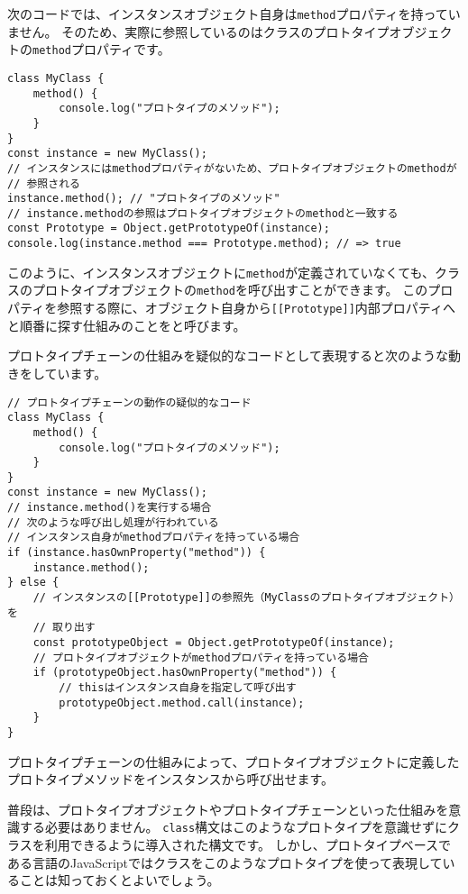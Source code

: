 次のコードでは、インスタンスオブジェクト自身は\texttt{method}プロパティを持っていません。
そのため、実際に参照しているのはクラスのプロトタイプオブジェクトの\texttt{method}プロパティです。

\begin{lstlisting}
class MyClass {
    method() {
        console.log("プロトタイプのメソッド");
    }
}
const instance = new MyClass();
// インスタンスにはmethodプロパティがないため、プロトタイプオブジェクトのmethodが
// 参照される
instance.method(); // "プロトタイプのメソッド"
// instance.methodの参照はプロトタイプオブジェクトのmethodと一致する
const Prototype = Object.getPrototypeOf(instance);
console.log(instance.method === Prototype.method); // => true
\end{lstlisting}

このように、インスタンスオブジェクトに\texttt{method}が定義されていなくても、クラスのプロトタイプオブジェクトの\texttt{method}を呼び出すことができます。
このプロパティを参照する際に、オブジェクト自身から\texttt{[[Prototype]]}内部プロパティへと順番に探す仕組みのことを\textbf{}と呼びます。

プロトタイプチェーンの仕組みを疑似的なコードとして表現すると次のような動きをしています。

\begin{lstlisting}
// プロトタイプチェーンの動作の疑似的なコード
class MyClass {
    method() {
        console.log("プロトタイプのメソッド");
    }
}
const instance = new MyClass();
// instance.method()を実行する場合
// 次のような呼び出し処理が行われている
// インスタンス自身がmethodプロパティを持っている場合
if (instance.hasOwnProperty("method")) {
    instance.method();
} else {
    // インスタンスの[[Prototype]]の参照先（MyClassのプロトタイプオブジェクト）を
    // 取り出す
    const prototypeObject = Object.getPrototypeOf(instance);
    // プロトタイプオブジェクトがmethodプロパティを持っている場合
    if (prototypeObject.hasOwnProperty("method")) {
        // thisはインスタンス自身を指定して呼び出す
        prototypeObject.method.call(instance);
    }
}
\end{lstlisting}

プロトタイプチェーンの仕組みによって、プロトタイプオブジェクトに定義したプロトタイプメソッドをインスタンスから呼び出せます。

普段は、プロトタイプオブジェクトやプロトタイプチェーンといった仕組みを意識する必要はありません。
\texttt{class}構文はこのようなプロトタイプを意識せずにクラスを利用できるように導入された構文です。
しかし、プロトタイプベースである言語のJavaScriptではクラスをこのようなプロトタイプを使って表現していることは知っておくとよいでしょう。

